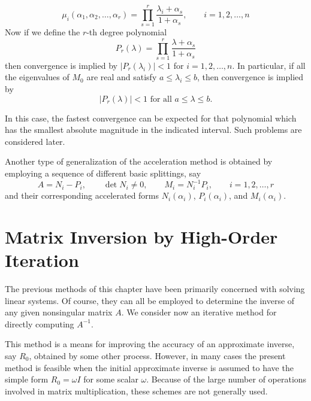 \documentclass[../main.tex]{subfiles}
\begin{document}
\begin{equation}
	\mu_i(\alpha_1, \alpha_2, \ldots, \alpha_r) = \prod_{s=1}^r \frac{\lambda_i + \alpha_s}{1 + \alpha_s}, \qquad i = 1, 2, \ldots, n
\end{equation}
Now if we define the $r$-th degree polynomial
\begin{equation*}
	P_r(\lambda) = \prod_{s=1}^r \frac{\lambda + \alpha_s}{1 + \alpha_s}
\end{equation*}
then convergence is implied by $| P_r(\lambda_i) | < 1$ for $i = 1, 2, \ldots, n$. In particular, if all the eigenvalues of $M_0$ are real and satisfy $a \leq \lambda_i \leq b$, then convergence is implied by
\begin{equation}
	| P_r(\lambda) | < 1 \text{ for all } a \leq \lambda \leq b.
\end{equation}

In this case, the fastest convergence can be expected for that polynomial which has the smallest absolute magnitude in the indicated interval. Such problems are considered later.

Another type of generalization of the acceleration method is obtained by employing a sequence of different basic splittings, say
\begin{equation*}
	A = N_i - P_i, \qquad \det N_i \neq 0, \qquad M_i = N_i^{-1} P_i, \qquad i = 1, 2, \ldots, r
\end{equation*}
and their corresponding accelerated forms $N_i(\alpha_i)$, $P_i(\alpha_i)$, and $M_i(\alpha_i)$.

\section{Matrix Inversion by High-Order Iteration}
The previous methods of this chapter have been primarily concerned with solving linear systems. Of course, they can all be employed to determine the inverse of any given nonsingular matrix $A$. We consider now an iterative method for directly computing $A^{-1}$.

This method is a means for improving the accuracy of an approximate inverse, say $R_0$, obtained by some other process. However, in many cases the present method is feasible when the initial approximate inverse is assumed to have the simple form $R_0 = \omega I$ for some scalar $\omega$. Because of the large number of operations involved in matrix multiplication, these schemes are not generally used.
\end{document}
